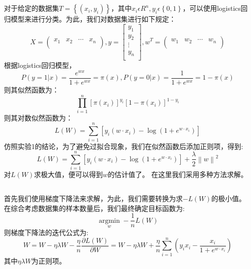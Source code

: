 \documentclass[lang=cn,a4paper,cite=authoryear]{elegantpaper}
\begin{document}
\section*{}
对于给定的数据集$T=\left\{ \left( x_i,y_i \right) \right\} $，其中$x_i\epsilon R^n,y_i\epsilon \left\{ 0,1 \right\} $，可以使用logistics回归模型来进行分类。为此，我们对数据集进行如下规定：
$$
X=\left( \begin{matrix}
	x_1&		x_2&		\cdots&		x_n\\
\end{matrix} \right) ,y=\left[ \begin{array}{c}
	y_1\\
	y_2\\
	\vdots\\
	y_n\\
\end{array} \right] ,w^T=\left( \begin{matrix}
	w_1&		w_2&		\cdots&		w_n\\
\end{matrix} \right) 
$$
根据logistics回归模型，
\begin{equation}
P\left( y=1|x \right) =\frac{e^{wx}}{1+e^{wx}}=\pi \left( x \right) ,P\left( y=0|x \right) =\frac{1}{1+e^{wx}}=1-\pi \left( x \right) 
\end{equation}
则其似然函数为：
\begin{equation}
\prod_{i=1}^n{\left[ \pi \left( x_i \right) \right] ^{y_i}\left[ 1-\pi \left( x_i \right) \right] ^{1-y_i}}
\end{equation}
则其对数似然函数为：
\begin{equation}
L\left( W \right) =\sum_{i=1}^n{\left[ y_i\left( w\cdot x_i \right) -\log \left( 1+e^{w\cdot x_i} \right) \right]}
\end{equation}      
仿照实验1的结论，为了避免过拟合现象，我们在似然函数后添加正则项，得到:
\begin{equation}
L\left( W \right) =\sum_{i=1}^n{\left[ y_i\left( w\cdot x_i \right) -\log \left( 1+e^{w\cdot x_i} \right) \right]}+\frac{\lambda}{2}\left\| w \right\| ^2
\end{equation}
对$L\left( W \right)$求极大值，便可以得到$w$的估计值了。
在这里我们采用多种方法求解。
\subsection*{}
\par 首先我们使用梯度下降法来求解，为此，我们需要转换为求$-L\left( W \right)$的极小值。在综合考虑数据集的样本数量后，我们最终确定目标函数为:
\begin{equation}
	\mathop {arg\min} \limits_{w}-\frac{1}{n}L\left( W \right) 
\end{equation}    
则梯度下降法的迭代公式为:
\begin{equation}
	W=W-\eta \lambda W-\frac{\eta}{n}\frac{\partial L\left( W \right)}{\partial W}=W-\eta \lambda W+\frac{\eta}{n}\sum_{i=1}^n{\left( y_ix_i-\frac{x_i}{1+e^{w\cdot x_i}} \right)}	 
\end{equation}
其中$\eta \lambda W$为正则项。
\end{document}
